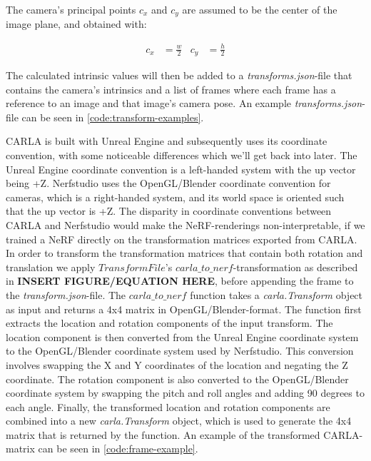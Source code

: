 The camera's principal points $c_x$ and $c_y$ are assumed to be the center of the image plane, and obtained with:

\begin{align*}
c_x &= \frac{w}{2} &
c_y &= \frac{h}{2}
\end{align*}

The calculated intrinsic values will then be added to a \textit{transforms.json}-file that contains the camera's intrinsics and a list of frames where each frame has a reference to an image and that image's camera pose. An example \textit{transforms.json}-file can be seen in \autoref{code:transform-examples}.



CARLA is built with Unreal Engine and subsequently uses its coordinate convention, with some noticeable differences which we'll get back into later. The Unreal Engine coordinate convention is a left-handed system with the up vector being +Z. Nerfstudio uses the OpenGL/Blender coordinate convention for cameras, which is a right-handed system, and its world space is oriented such that the up vector is +Z. The disparity in coordinate conventions between CARLA and Nerfstudio would make the NeRF-renderings non-interpretable, if we trained a NeRF directly on the transformation matrices exported from CARLA. In order to transform the transformation matrices that contain both rotation and translation we apply $TransformFile$'s $carla\_to\_nerf$-transformation as described in \textbf{INSERT FIGURE/EQUATION HERE}, before appending the frame to the \textit{transform.json}-file. The $carla\_to\_nerf$ function takes a \textit{carla.Transform} object as input and returns a 4x4 matrix in OpenGL/Blender-format. The function first extracts the location and rotation components of the input transform. The location component is then converted from the Unreal Engine coordinate system to the OpenGL/Blender coordinate system used by Nerfstudio. This conversion involves swapping the X and Y coordinates of the location and negating the Z coordinate. The rotation component is also converted to the OpenGL/Blender coordinate system by swapping the pitch and roll angles and adding 90 degrees to each angle. Finally, the transformed location and rotation components are combined into a new \textit{carla.Transform} object, which is used to generate the 4x4 matrix that is returned by the function. An example of the transformed CARLA-matrix can be seen in \autoref{code:frame-example}.




